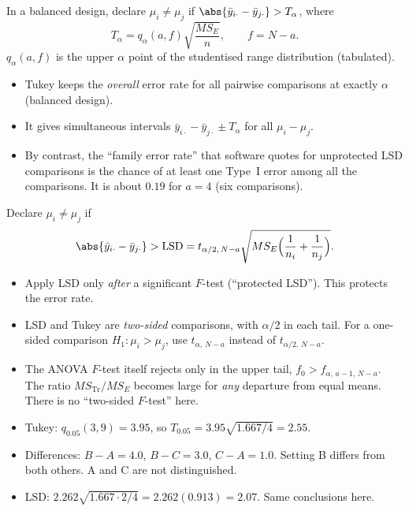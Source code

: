 \begin{definition}
In a balanced design, declare $\mu_i\ne\mu_j$ if $\abs{\bar{y}_{i\cdot}-\bar{y}_{j\cdot}}>T_\alpha$, where
\[ T_\alpha=q_\alpha(a,f)\sqrt{\frac{MS_E}n},\qquad f=N-a. \]
$q_\alpha(a,f)$ is the upper $\alpha$ point of the studentised range distribution (tabulated).
\begin{itemize}
  \item Tukey keeps the \emph{overall} error rate for all pairwise comparisons at exactly $\alpha$ (balanced design).
  \item It gives simultaneous intervals $\bar{y}_{i\cdot}-\bar{y}_{j\cdot}\pm T_\alpha$ for all $\mu_i-\mu_j$.
  \item By contrast, the ``family error rate'' that software quotes for unprotected LSD comparisons is the chance of at least one Type~I error among all the comparisons. It is about $0.19$ for $a=4$ (six comparisons).
\end{itemize}
\end{definition}

\begin{definition}
Declare $\mu_i\ne\mu_j$ if
\[ \abs{\bar{y}_{i\cdot}-\bar{y}_{j\cdot}}>\mathrm{LSD}=t_{\alpha/2,\,N-a}\sqrt{MS_E\Big(\frac1{n_i}+\frac1{n_j}\Big)}. \]
\begin{itemize}
  \item Apply LSD only \emph{after} a significant $F$-test (``protected LSD''). This protects the error rate.
  \item LSD and Tukey are \emph{two-sided} comparisons, with $\alpha/2$ in each tail. For a one-sided comparison $H_1:\mu_i>\mu_j$, use $t_{\alpha,\,N-a}$ instead of $t_{\alpha/2,\,N-a}$.
  \item The ANOVA $F$-test itself rejects only in the upper tail, $f_0>f_{\alpha,\,a-1,\,N-a}$. The ratio $MS_{\text{Tr}}/MS_E$ becomes large for \emph{any} departure from equal means. There is no ``two-sided $F$-test'' here.
\end{itemize}
\end{definition}

\begin{example}
\begin{itemize}
  \item Tukey: $q_{0.05}(3,9)=3.95$, so $T_{0.05}=3.95\sqrt{1.667/4}=2.55$.
  \item Differences: $B-A=4.0$, $B-C=3.0$, $C-A=1.0$. Setting B differs from both others. A and C are not distinguished.
  \item LSD: $2.262\sqrt{1.667\cdot2/4}=2.262(0.913)=2.07$. Same conclusions here.
\end{itemize}
\end{example}

